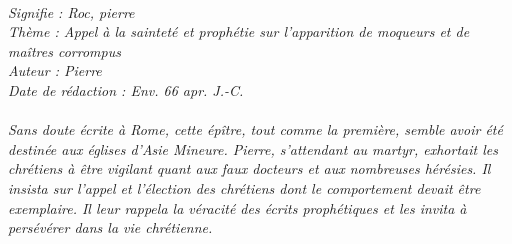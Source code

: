 \BFont
\noindent\hrulefill
\textit{
\bigskip
{\centering{}
\\Signifie : Roc, pierre
\\Thème : Appel à la sainteté et prophétie sur l'apparition de moqueurs et de maîtres corrompus
\\Auteur : Pierre
\\Date de rédaction : Env. 66 apr. J.-C.\\}
}
\textit{
\\Sans doute écrite à Rome, cette épître, tout comme la première, semble avoir été destinée aux églises d’Asie Mineure. Pierre, s’attendant au martyr, exhortait les chrétiens à être vigilant quant aux faux docteurs et aux nombreuses hérésies. Il insista sur l’appel et l’élection des chrétiens dont le comportement devait être exemplaire. Il leur rappela la véracité des écrits prophétiques et les invita à persévérer dans la vie chrétienne.\bigskip
}
\par\nobreak\noindent\hrulefill
